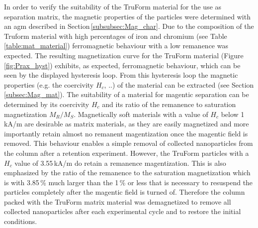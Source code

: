 In order to verify the suitability of the TruForm material for the use as separation matrix, the magnetic properties of the particles were determined with an \gls{agm} described in Section\,\ref{subsubsec:Mag_char}. Due to the composition of the Truform material with high percentages of iron and chromium (see Table\,\ref{table:mat_material}) ferromagnetic behaviour with a low remanence was expected. The resulting magnetization curve for the TruForm material (Figure\,\ref{fig:Prax_hyst}) exhibits, as expected, ferromagnetic behaviour, which can be seen by the displayed hysteresis loop. From this hysteresis loop the magnetic properties (e.g. the coercivity $H_{c}$, ..) of the material can be extracted (see Section \ref{subsec:Mag_mat}). The suitability of a material for magentic separation can be determined by its coercivity $H_{c}$ and its ratio of the remanence to saturation magnetization $M_{R}/M_{S}$. Magnetically soft materials with a value of $H_{c}$ below 1\,kA/m are desirable as matrix materials, as they are easily magnetized and more importantly retain almost no remanent magentization once the magentic field is removed. This behaviour enables a simple removal of collected nanoparticles from the column after a retention experiment. However, the TruForm particles with a $H_{c}$ value of 3.55\,kA/m do retain a remanence magentization. This is also emphasized by the ratio of the remanence to the saturation magnetization which is with 3.85\,\% much larger than the 1\,\% or less that is necessary to resuspend the particles completely after the magentic field is turned of. Therefore the column packed with the TruForm matrix material was demagnetized to remove all collected nanoparticles after each experimental cycle and to restore the initial conditions.\\ 

